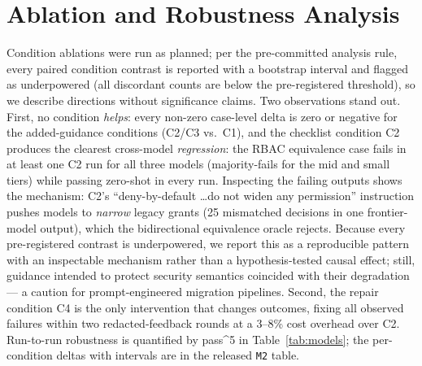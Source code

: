\documentclass{ieeetj}
\begin{document}
\section{Ablation and Robustness Analysis}
\label{sec:ablation}
Condition ablations were run as planned; per the pre-committed analysis rule, every paired
condition contrast is reported with a bootstrap interval and flagged as underpowered (all
discordant counts are below the pre-registered threshold), so we describe directions without
significance claims. Two observations stand out. First, no condition \emph{helps}: every
non-zero case-level delta is zero or negative for the added-guidance conditions (C2/C3 vs.\
C1), and the checklist condition C2 produces the clearest cross-model \emph{regression}: the RBAC
equivalence case fails in at least one C2 run for all three models (majority-fails for the
mid and small tiers) while passing zero-shot in every run. Inspecting
the failing outputs shows the mechanism: C2's ``deny-by-default \ldots do not widen any permission'' instruction
pushes models to \emph{narrow} legacy grants (25 mismatched decisions in one frontier-model
output), which the bidirectional equivalence oracle rejects. Because every pre-registered contrast is underpowered, we report this as a reproducible
pattern with an inspectable mechanism rather than a hypothesis-tested causal effect; still,
guidance intended to protect security semantics coincided with their degradation --- a
caution for prompt-engineered migration pipelines.
Second, the repair condition C4 is the only intervention that changes outcomes, fixing all
observed failures within two redacted-feedback rounds at a 3--8\% cost overhead over C2. Run-to-run
robustness is quantified by pass\textasciicircum{}5 in Table~\ref{tab:models}; the
per-condition deltas with intervals are in the released \texttt{M2} table.
\end{document}
